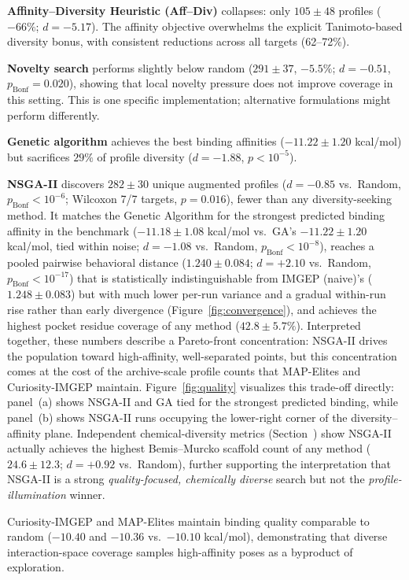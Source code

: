 \documentclass[journal=jcisd8,manuscript=article]{achemso}
\begin{document}
\textbf{Affinity--Diversity Heuristic (Aff--Div)} collapses: only $105 \pm 48$ profiles ($-66\%$; $d = -5.17$). The affinity objective overwhelms the explicit Tanimoto-based diversity bonus, with consistent reductions across all targets (62--72\%).

\textbf{Novelty search} performs slightly below random ($291 \pm 37$, $-5.5\%$; $d = -0.51$, $p_\text{Bonf} = 0.020$), showing that local novelty pressure does not improve coverage in this setting. This is one specific implementation; alternative formulations might perform differently.

\textbf{Genetic algorithm} achieves the best binding affinities ($-11.22 \pm 1.20$ kcal/mol) but sacrifices $29\%$ of profile diversity ($d = -1.88$, $p < 10^{-5}$).

\textbf{NSGA-II} discovers $282 \pm 30$ unique augmented profiles ($d = -0.85$ vs.\ Random, $p_\text{Bonf} < 10^{-6}$; Wilcoxon 7/7 targets, $p = 0.016$), fewer than any diversity-seeking method. It matches the Genetic Algorithm for the strongest predicted binding affinity in the benchmark ($-11.18 \pm 1.08$ kcal/mol vs.\ GA's $-11.22 \pm 1.20$ kcal/mol, tied within noise; $d = -1.08$ vs.\ Random, $p_\text{Bonf} < 10^{-8}$), reaches a pooled pairwise behavioral distance ($1.240 \pm 0.084$; $d = +2.10$ vs.\ Random, $p_\text{Bonf} < 10^{-17}$) that is statistically indistinguishable from IMGEP (naive)'s ($1.248 \pm 0.083$) but with much lower per-run variance and a gradual within-run rise rather than early divergence (Figure~\ref{fig:convergence}), and achieves the highest pocket residue coverage of any method ($42.8 \pm 5.7\%$). Interpreted together, these numbers describe a Pareto-front concentration: NSGA-II drives the population toward high-affinity, well-separated points, but this concentration comes at the cost of the archive-scale profile counts that MAP-Elites and Curiosity-IMGEP maintain. Figure~\ref{fig:quality} visualizes this trade-off directly: panel~(a) shows NSGA-II and GA tied for the strongest predicted binding, while panel~(b) shows NSGA-II runs occupying the lower-right corner of the diversity--affinity plane. Independent chemical-diversity metrics (Section~) show NSGA-II actually achieves the highest Bemis--Murcko scaffold count of any method ($24.6 \pm 12.3$; $d = +0.92$ vs.\ Random), further supporting the interpretation that NSGA-II is a strong \emph{quality-focused, chemically diverse} search but not the \emph{profile-illumination} winner.

Curiosity-IMGEP and MAP-Elites maintain binding quality comparable to random ($-10.40$ and $-10.36$ vs.\ $-10.10$ kcal/mol), demonstrating that diverse interaction-space coverage samples high-affinity poses as a byproduct of exploration.
\end{document}
